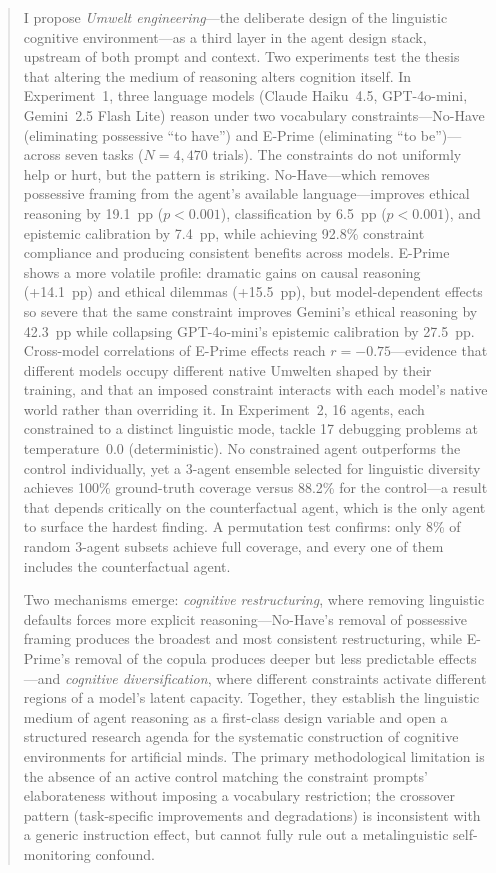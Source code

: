 \documentclass[11pt,a4paper]{article}
\begin{document}
\begin{abstract}
I propose \emph{Umwelt engineering}---the deliberate design of the linguistic cognitive environment---as a third layer in the agent design stack, upstream of both prompt and context. Two experiments test the thesis that altering the medium of reasoning alters cognition itself. In Experiment~1, three language models (Claude Haiku~4.5, GPT-4o-mini, Gemini~2.5 Flash Lite) reason under two vocabulary constraints---No-Have (eliminating possessive ``to have'') and E-Prime (eliminating ``to be'')---across seven tasks ($N{=}4{,}470$ trials). The constraints do not uniformly help or hurt, but the pattern is striking. No-Have---which removes possessive framing from the agent's available language---improves ethical reasoning by 19.1~pp ($p < 0.001$), classification by 6.5~pp ($p < 0.001$), and epistemic calibration by 7.4~pp, while achieving 92.8\% constraint compliance and producing consistent benefits across models. E-Prime shows a more volatile profile: dramatic gains on causal reasoning (+14.1~pp) and ethical dilemmas (+15.5~pp), but model-dependent effects so severe that the same constraint improves Gemini's ethical reasoning by 42.3~pp while collapsing GPT-4o-mini's epistemic calibration by 27.5~pp. Cross-model correlations of E-Prime effects reach $r = -0.75$---evidence that different models occupy different native Umwelten shaped by their training, and that an imposed constraint interacts with each model's native world rather than overriding it. In Experiment~2, 16 agents, each constrained to a distinct linguistic mode, tackle 17 debugging problems at temperature~0.0 (deterministic). No constrained agent outperforms the control individually, yet a 3-agent ensemble selected for linguistic diversity achieves 100\% ground-truth coverage versus 88.2\% for the control---a result that depends critically on the counterfactual agent, which is the only agent to surface the hardest finding. A permutation test confirms: only 8\% of random 3-agent subsets achieve full coverage, and every one of them includes the counterfactual agent.

Two mechanisms emerge: \emph{cognitive restructuring}, where removing linguistic defaults forces more explicit reasoning---No-Have's removal of possessive framing produces the broadest and most consistent restructuring, while E-Prime's removal of the copula produces deeper but less predictable effects---and \emph{cognitive diversification}, where different constraints activate different regions of a model's latent capacity. Together, they establish the linguistic medium of agent reasoning as a first-class design variable and open a structured research agenda for the systematic construction of cognitive environments for artificial minds. The primary methodological limitation is the absence of an active control matching the constraint prompts' elaborateness without imposing a vocabulary restriction; the crossover pattern (task-specific improvements and degradations) is inconsistent with a generic instruction effect, but cannot fully rule out a metalinguistic self-monitoring confound.
\end{abstract}
\end{document}

